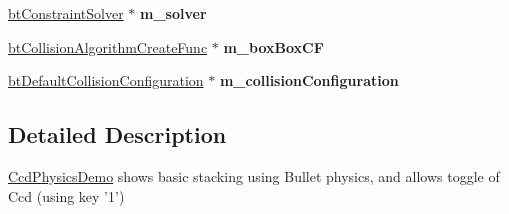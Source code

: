 \begin{DoxyCompactItemize}
\item 
\hypertarget{class_soft_demo_aab0e5972182893cee0b75f881691c129}{\hyperlink{classbt_constraint_solver}{bt\+Constraint\+Solver} $\ast$ {\bfseries m\+\_\+solver}}\label{class_soft_demo_aab0e5972182893cee0b75f881691c129}

\item 
\hypertarget{class_soft_demo_a25d68ccd00df4f779796f3d9532c4d18}{\hyperlink{structbt_collision_algorithm_create_func}{bt\+Collision\+Algorithm\+Create\+Func} $\ast$ {\bfseries m\+\_\+box\+Box\+C\+F}}\label{class_soft_demo_a25d68ccd00df4f779796f3d9532c4d18}

\item 
\hypertarget{class_soft_demo_a6371f5a323cf248a57c062e9de285a17}{\hyperlink{classbt_default_collision_configuration}{bt\+Default\+Collision\+Configuration} $\ast$ {\bfseries m\+\_\+collision\+Configuration}}\label{class_soft_demo_a6371f5a323cf248a57c062e9de285a17}

\end{DoxyCompactItemize}


\subsection{Detailed Description}
\hyperlink{class_ccd_physics_demo}{Ccd\+Physics\+Demo} shows basic stacking using Bullet physics, and allows toggle of Ccd (using key '1') 

